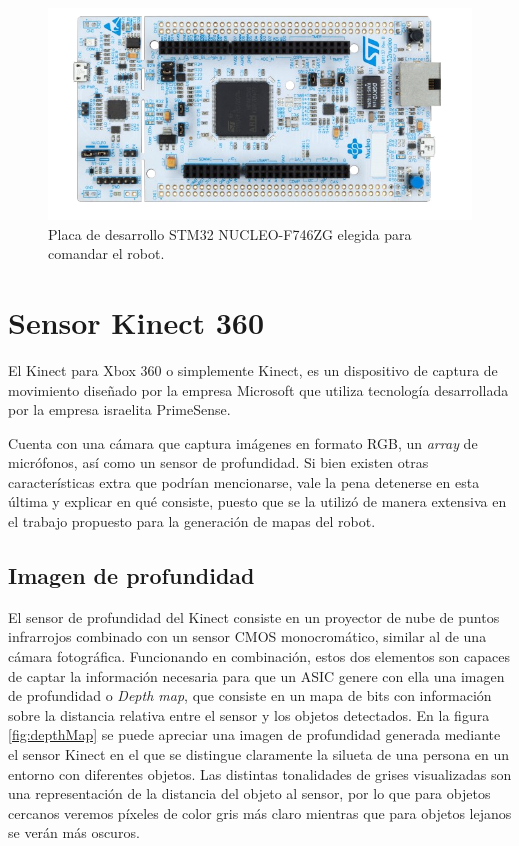 \begin{figure}[ht]
    \centering
    \includegraphics[scale=1.3]{./Figures/stm32nucleo.png}
    \caption{Placa de desarrollo STM32 NUCLEO-F746ZG elegida para comandar el robot\protect\footnotemark.}
    \label{fig:stm32nucleo}
\end{figure}


\section{Sensor Kinect 360}

El Kinect para Xbox 360 o simplemente Kinect, es un dispositivo de captura de movimiento diseñado por la empresa Microsoft que utiliza tecnología desarrollada por la empresa israelita PrimeSense.

Cuenta con una cámara que captura imágenes en formato RGB, un \textit{array} de micrófonos, así como un sensor de profundidad. Si bien existen otras características extra que podrían mencionarse, vale la pena detenerse en esta última y explicar en qué consiste, puesto que se la utilizó de manera extensiva en el trabajo propuesto para la generación de mapas del robot.

\subsection{Imagen de profundidad}

El sensor de profundidad del Kinect consiste en un proyector de nube de puntos infrarrojos combinado con un sensor CMOS monocromático, similar al de una cámara fotográfica. Funcionando en combinación, estos dos elementos son capaces de captar la información necesaria para que un ASIC genere con ella una imagen de profundidad o \textit{Depth map}, que consiste en un mapa de bits con información sobre la distancia relativa entre el sensor y los objetos detectados. En la figura \ref{fig:depthMap} se puede apreciar una imagen de profundidad generada mediante el sensor Kinect en el que se distingue claramente la silueta de una persona en un entorno con diferentes objetos. Las distintas tonalidades de grises visualizadas son una representación de la distancia del objeto al sensor, por lo que para objetos cercanos veremos píxeles de color gris más claro mientras que para objetos lejanos se verán más oscuros.

